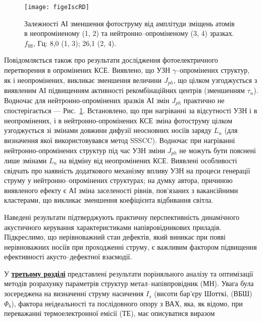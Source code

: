 \begin{figure}[ht]
\center
\texttt{[image: figeIscRD]}
\caption{\label{figeIscRD}
Залежності АІ зменшення фотоструму від
амплітуди зміщень атомів в неопроміненому (1, 2)
та нейтронно--опроміненому (3, 4) зразках.
$f_\mathtt{US}$, Гц: 8,0 (1, 3);
26,1 (2, 4).
}%
\end{figure}
Повідомляється також про результати дослідження фотоелектричного перетворення в опромінених КСЕ.
Виявлено, що УЗН $\gamma$--опромінених структур, як і неопромінених, викликає зменшення величини $J_{ph}$, що цілком
узгоджується з виявленим АІ підвищенням активності рекомбінаційних центрів (зменшенням $\tau_n$).
Водночас для нейтронно-опромінених зразків АІ змін $J_{ph}$ практично не спостерігається --- Рис.~\ref{figeIscRD}.
Встановлено, що при нагріванні за відсутності УЗН і в неопромінених, і в нейтронно-опромінених КСЕ зміна фотоструму
цілком узгоджується зі змінами довжини дифузії неосновних носіїв заряду $L_n$ (для визначення якої використовувався метод SSSCC).
Водночас при нагріванні нейтронно-опромінених структур під час УЗН зміни $J_{ph}$ не можуть бути пояснені лише змінами $L_n$ на відміну від неопромінених КСЕ.
Виявлені особливості свідчать про наявність додаткового механізму впливу УЗН на процеси генерації струму у нейтронно--опромінених структурах;
на думку автора, причиною виявленого ефекту є АІ зміна заселеності рівнів, пов'язаних з вакансійними кластерами, що викликає зменшення коефіцієнта відбивання світла.


Наведені   результати  підтверджують  практичну перспективність динамічного акустичного керування характеристиками напівровідникових приладів.
Підкреслимо, що нерівноважний стан дефектів, який виникає при появі нерівноважних носіїв при проходженні струму, є важливим фактором підвищення ефективності акусто--дефектної взаємодії.

У  \underline{\textbf{третьому розділі}} представлені результати поріняльного аналізу та оптимізації методів розрахунку параметрів структур метал--напівпровідник (МН).
Увага була зосереджена на визначенні струму насичення  $I_s$ (висоти бар'єру Шотткі, (ВБШ) $\Phi_b$), фактора неідеальності та послідовного опору з ВАХ, яка, як відомо, при переважанні термоелектронної емісії (ТЕ), має описуватися виразом

